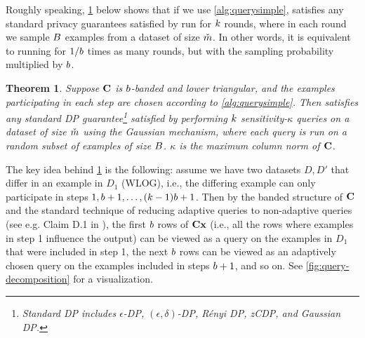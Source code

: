 \documentclass{article}
\newtheorem{theorem}{Theorem}
\begin{document}
Roughly speaking, \cref{thm:sampling-amplification} below shows that if we use \cref{alg:querysimple}, \BANDMF satisfies any standard privacy guarantees satisfied by \DPSGD run for $k$ rounds, where in each round we sample $B$ examples from a dataset of size $\check{m}$. In other words, it is equivalent to running \DPSGD for $1/b$ times as many rounds, but with the sampling probability multiplied by $b$. %

\begin{theorem}\label{thm:sampling-amplification}
Suppose $\mathbf{C}$ is $b$-banded and lower triangular, and the examples participating in each step are chosen according to \cref{alg:querysimple}. Then \BANDMF satisfies any standard DP guarantee\footnote{Standard DP includes $\epsilon$-DP, $(\epsilon,\delta)$-DP, R\'enyi DP, zCDP, and Gaussian DP.} satisfied by performing $k$ sensitivity-$\kappa$ queries on a dataset of size $\check{m}$ using the Gaussian mechanism, where each query is run on a random subset of examples of size $B$. $\kappa$ is the maximum column norm of $\mathbf{C}$. %
\end{theorem}
%
%
The key idea behind \cref{thm:sampling-amplification} is the following: assume we have two datasets $D, D'$ that differ in an example in $D_1$ (WLOG), i.e., the differing example can only participate in steps $1, b + 1, \ldots, (k-1)b + 1$. Then by the banded structure of $\mathbf{C}$ and the standard technique of reducing adaptive queries to non-adaptive queries (see e.g. Claim D.1 in \cite{denisov22matfact}), the first $b$ rows of $\mathbf{C} \mathbf{x}$ (i.e., all the rows where examples in step 1 influence the output) can be viewed as a query on the examples in $D_1$ that were included in step 1, the next $b$ rows can be viewed as an adaptively chosen query on the examples included in steps $b + 1$, and so on. See \cref{fig:query-decomposition} for a visualization. 
\end{document}
